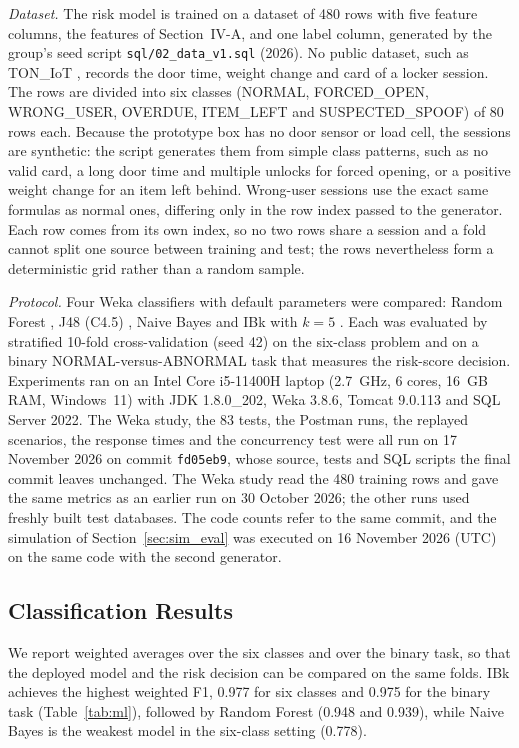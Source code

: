 \documentclass[journal,onecolumn]{IEEEtran}
\newcommand{\revisioncommit}{fd05eb9}
\begin{document}
\textit{Dataset.} The risk model is trained on a dataset of 480 rows with five feature columns, the features of
Section~IV-A, and one label column, generated by the group's seed script \texttt{sql/02\_data\_v1.sql} (2026). No
public dataset, such as TON\_IoT \cite{moustafa2021toniot}, records the door time, weight change and card of a locker
session. The rows are divided into six classes (NORMAL, FORCED\_OPEN,
WRONG\_USER, OVERDUE, ITEM\_LEFT and SUSPECTED\_SPOOF) of 80 rows each. Because the prototype box has no door sensor or
load cell, the sessions are synthetic: the script generates them from simple class patterns, such as no valid card, a
long door time and multiple unlocks for forced opening, or a positive weight change for an item left behind. Wrong-user
sessions use the exact same formulas as normal ones, differing only in the row index passed to the generator. Each
row comes from its own index, so no two rows share a session and a fold cannot split one source between training and
test; the rows nevertheless form a deterministic grid rather than a random sample.

\textit{Protocol.} Four Weka classifiers with default parameters were compared: Random Forest \cite{breiman2001rf},
J48 (C4.5) \cite{quinlan1993c45}, Naive Bayes \cite{john1995nb} and IBk with $k = 5$ \cite{aha1991ibl}. Each was
evaluated by stratified 10-fold cross-validation \cite{kohavi1995cv} (seed 42) on the six-class problem and on a binary
NORMAL-versus-ABNORMAL task that measures the risk-score decision. Experiments ran on an Intel
Core i5-11400H laptop (2.7~GHz, 6 cores, 16~GB RAM, Windows~11) with JDK 1.8.0\_202, Weka 3.8.6, Tomcat 9.0.113 and SQL
Server 2022. The Weka study, the 83 tests, the Postman runs, the replayed scenarios, the response times and the
concurrency test were all run on 17 November 2026 on commit \texttt{\revisioncommit}, whose source, tests and SQL scripts
the final commit leaves unchanged. The Weka study read the 480 training rows and gave the same metrics as an earlier run
on 30 October 2026; the other runs used freshly built test databases.
The code counts refer to the same commit, and the simulation of Section~\ref{sec:sim_eval} was executed on
16 November 2026 (UTC) on the same code with the second generator.

\subsection{Classification Results}

We report weighted averages over the six classes and over the binary task, so that the deployed model and the risk
decision can be compared on the same folds. IBk achieves the highest weighted F1, 0.977 for six classes and 0.975 for
the binary task (Table~\ref{tab:ml}), followed by Random Forest (0.948 and 0.939), while Naive Bayes is the weakest
model in the six-class setting (0.778).
\end{document}
